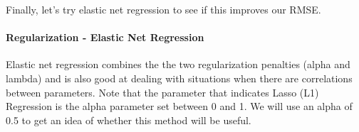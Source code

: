 \documentclass[
]{article}
\newenvironment{Shaded}{\begin{snugshade}}{\end{snugshade}}
\newcommand{\AttributeTok}[1]{\textcolor[rgb]{0.13,0.29,0.53}{#1}}
\newcommand{\CommentTok}[1]{\textcolor[rgb]{0.56,0.35,0.01}{\textit{#1}}}
\newcommand{\DecValTok}[1]{\textcolor[rgb]{0.00,0.00,0.81}{#1}}
\newcommand{\FloatTok}[1]{\textcolor[rgb]{0.00,0.00,0.81}{#1}}
\newcommand{\FunctionTok}[1]{\textcolor[rgb]{0.13,0.29,0.53}{\textbf{#1}}}
\newcommand{\NormalTok}[1]{#1}
\newcommand{\OtherTok}[1]{\textcolor[rgb]{0.56,0.35,0.01}{#1}}
\newcommand{\SpecialCharTok}[1]{\textcolor[rgb]{0.81,0.36,0.00}{\textbf{#1}}}
\newcommand{\StringTok}[1]{\textcolor[rgb]{0.31,0.60,0.02}{#1}}
\begin{document}
Finally, let's try elastic net regression to see if this improves our
RMSE.

\hypertarget{regularization---elastic-net-regression}{%
\paragraph{Regularization - Elastic Net
Regression}\label{regularization---elastic-net-regression}}

Elastic net regression combines the the two regularization penalties
(alpha and lambda) and is also good at dealing with situations when
there are correlations between parameters. Note that the parameter that
indicates Lasso (L1) Regression is the alpha parameter set between 0 and
1. We will use an alpha of 0.5 to get an idea of whether this method
will be useful.

\begin{Shaded}
\end{Shaded}
\end{document}

